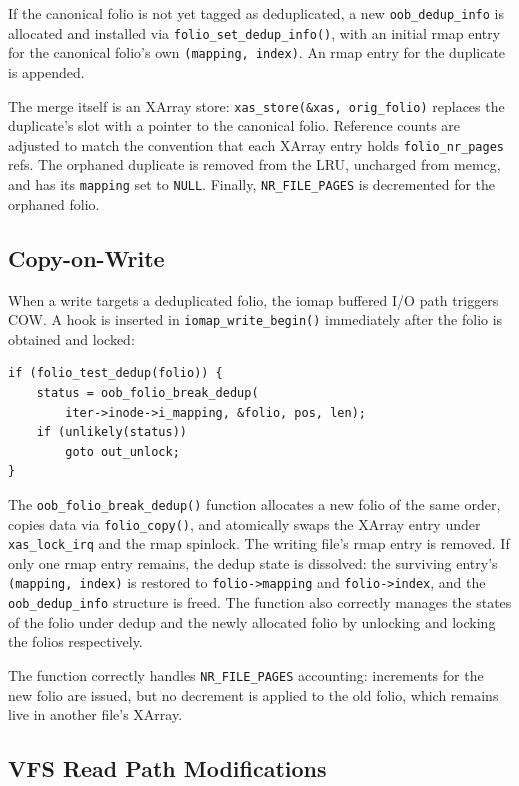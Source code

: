 \documentclass[conference]{IEEEtran}
\begin{document}
If the canonical folio is not yet tagged as deduplicated, a new \texttt{oob\_dedup\_info} is allocated and installed via \texttt{folio\_set\_dedup\_info()}, with an initial rmap entry for the canonical folio's own \texttt{(mapping, index)}. An rmap entry for the duplicate is appended.

The merge itself is an XArray store: \texttt{xas\_store(\&xas, orig\_folio)} replaces the duplicate's slot with a pointer to the canonical folio. Reference counts are adjusted to match the convention that each XArray entry holds \texttt{folio\_nr\_pages} refs. The orphaned duplicate is removed from the LRU, uncharged from memcg, and has its \texttt{mapping} set to \texttt{NULL}. Finally, \texttt{NR\_FILE\_PAGES} is decremented for the orphaned folio.

\subsection{Copy-on-Write}

When a write targets a deduplicated folio, the iomap buffered I/O path triggers COW. A hook is inserted in \texttt{iomap\_write\_begin()} immediately after the folio is obtained and locked:

\begin{lstlisting}[numbers=none]
if (folio_test_dedup(folio)) {
    status = oob_folio_break_dedup(
        iter->inode->i_mapping, &folio, pos, len);
    if (unlikely(status))
        goto out_unlock;
}
\end{lstlisting}

The \texttt{oob\_folio\_break\_dedup()} function allocates a new folio of the same order, copies data via \texttt{folio\_copy()}, and atomically swaps the XArray entry under \texttt{xas\_lock\_irq} and the rmap spinlock. The writing file's rmap entry is removed. If only one rmap entry remains, the dedup state is dissolved: the surviving entry's \texttt{(mapping, index)} is restored to \texttt{folio->mapping} and \texttt{folio->index}, and the \texttt{oob\_dedup\_info} structure is freed. The function also correctly manages the states of the folio under dedup and the newly allocated folio by unlocking and locking the folios respectively.

The function correctly handles \texttt{NR\_FILE\_PAGES} accounting: increments for the new folio are issued, but no decrement is applied to the old folio, which remains live in another file's XArray.

\subsection{VFS Read Path Modifications}
\end{document}
